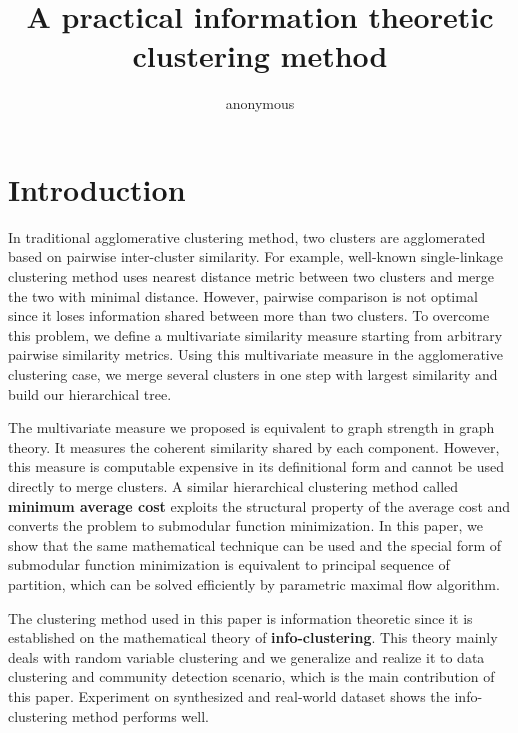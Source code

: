 \documentclass{article}
\title{A practical information theoretic clustering method}
\author{
  anonymous
}
\begin{document}

\maketitle

\begin{abstract}

\end{abstract}

\section{Introduction}
In traditional agglomerative clustering method, two clusters are agglomerated based on pairwise inter-cluster similarity.  For example, well-known single-linkage clustering method uses nearest distance metric between two clusters and merge the two with minimal distance\cite{RN16}.  However, pairwise comparison is not optimal since it loses information shared between more than two clusters.  To overcome this problem, we define a multivariate similarity measure starting from arbitrary pairwise similarity metrics. Using this multivariate measure in the agglomerative clustering case, we merge several clusters in one step with largest similarity and build our hierarchical tree.

The multivariate measure we proposed is equivalent to graph strength \cite{RN12} in graph theory. It measures the coherent similarity shared by each component. However, this measure is computable expensive in its definitional form and cannot be used directly to merge clusters. A similar hierarchical clustering method called \textbf{minimum average cost} exploits the structural property of the average cost and converts the problem to submodular function minimization\cite{RN7}. In this paper, we show that the same mathematical technique can be used and the special form of submodular function minimization is equivalent to principal sequence of partition\cite{RN3}, which can be solved efficiently by parametric maximal flow algorithm\cite{RN4}. 

The clustering method used in this paper is information theoretic since it is established on the mathematical theory of \textbf{info-clustering}\cite{RN1}. This theory mainly deals with random variable clustering and we generalize and realize it to data clustering and community detection scenario, which is the main contribution of this paper. Experiment on synthesized and real-world dataset shows the info-clustering method performs well. 
\end{document}
